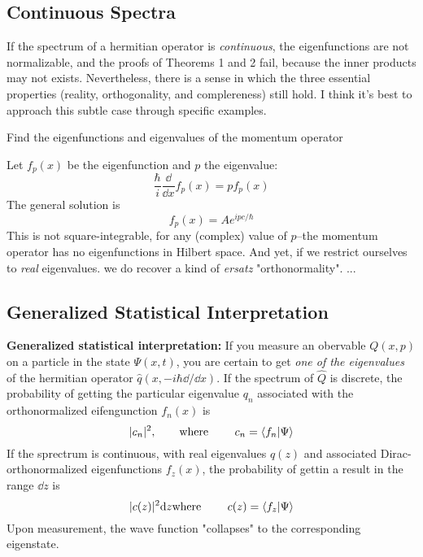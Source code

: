 \subsection{Continuous Spectra}
If the spectrum of a hermitian operator is \textit{continuous}, the eigenfunctions are not normalizable, and the proofs of Theorems 1 and 2 fail, because the inner products may not exists. Nevertheless, there is a sense in which the three essential properties (reality, orthogonality, and complereness) still hold. I think it's best to approach this subtle case through specific examples.

\begin{example}
	Find the eigenfunctions and eigenvalues of the momentum operator
\end{example}
Let $f_p(x)$ be the eigenfunction and $p$ the eigenvalue:
\begin{equation}\label{3.30}
	\frac{\hbar}{i}\frac{\dd}{\dd x}f_p(x)=pf_p(x)
\end{equation}
The general solution is $$f_p(x)=Ae^{ipc/\hbar}$$ This is not square-integrable, for any (complex) value of $p$--the momentum operator has no eigenfunctions in Hilbert space. And yet, if we restrict ourselves to \textit{real} eigenvalues. we do recover a kind of \textit{ersatz} "orthonormality". ...

\subsection{Generalized Statistical Interpretation}
\textbf{Generalized statistical interpretation:} If you measure an obervable $Q(x,p)$ on a particle in the state $\Psi(x,t)$, you are certain to get \textit{one of the eigenvalues} of the hermitian operator $\hat{q}(x,-i\hbar\dd/\dd x)$. If the spectrum of $\hat{Q}$ is discrete, the probability of getting the particular eigenvalue $q_n$ associated with the orthonormalized eifengunction $f_n(x)$ is
\begin{equation}\label{3.43}
	|c_n|^2,\qquad \mbox{where }\qquad c_n=\braket{f_n}{\Psi}
\end{equation}
If the sprectrum is continuous, with real eigenvalues $q(z)$ and associated Dirac-orthonormalized eigenfunctions $f_z(x)$, the probability of gettin a result in the range $\dd z$ is
\begin{equation}\label{3.44}
	|c(z)|^2\dd z \mbox{where }\qquad c(z)=\braket{f_z}{\Psi}
\end{equation}
Upon measurement, the wave function "collapses" to the corresponding eigenstate.

